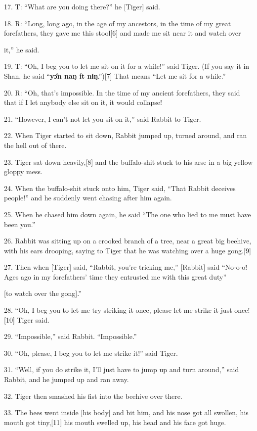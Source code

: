 {17. T: ``What are you doing there?'' he [Tiger] said.}

{18. R: ``Long, long ago, in the age of my ancestors, in the time
of my great forefathers, they gave me this stool[6] and made me sit near it and
watch over      }

{it,'' he  said.}

{19. T: ``Oh, I beg you to let me sit on it for a while!'' said Tiger. (If
you say it in Shan, he said ``}{\textbf{yɔ̂n naŋ ít nɨŋ}}{.'')[7]
That means ``Let me sit for a while.''}

{20. R: ``Oh, that's impossible. In the time of my ancient forefathers,
they said that if I let anybody else sit on it, it would collapse!}

{21. ``However, I can't not let you sit on it,'' said Rabbit to Tiger.}

{22. When Tiger started to sit down, Rabbit jumped up, turned around, and
ran the hell out of there.}

{23. Tiger sat down heavily,[8] and the buffalo-shit stuck to his arse in
a big yellow gloppy mess.}

{24. When the buffalo-shit stuck onto him, Tiger said, ``That Rabbit deceives
people!'' and he suddenly went chasing after him again.}

{25. When he chased him down again, he said ``The one who lied to me must
have been you.''}

{26. Rabbit was sitting up on a crooked branch of a tree, near a great big
beehive, with his ears drooping, saying to Tiger that he was watching over a huge
gong.[9]}

{27. Then when [Tiger] said, ``Rabbit, you're tricking me,'' [Rabbit] said
``No-o-o! Ages ago in my forefathers' time they entrusted me with this great duty''
}

{[to watch over the gong].''}

{28. ``Oh, I beg you to let me try striking it once, please let me strike
it just once![10] Tiger said.}

{29. ``Impossible,'' said Rabbit. ``Impossible.''}

{30. ``Oh, please, I beg you to let me strike it!'' said Tiger.}

{31. ``Well, if you do strike it, I'll just have to jump up and turn around,''
said Rabbit, and he jumped up and ran away.}

{32. Tiger then smashed his fist into the beehive over there.}

{33. The bees went inside [his body] and bit him, and his nose got all swollen,
his mouth got tiny,[11] his mouth swelled up, his head and his face got huge.}

